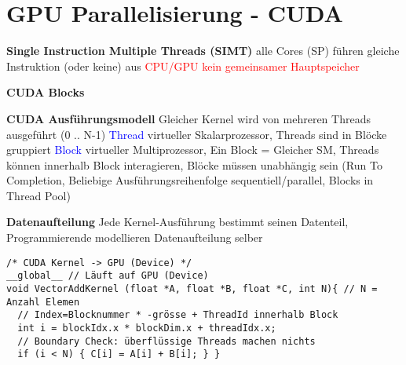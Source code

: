 \section{GPU Parallelisierung - CUDA}

\textbf{Single Instruction Multiple Threads (SIMT)} alle Cores (SP) führen gleiche Instruktion (oder keine) aus \textcolor{red}{CPU/GPU kein gemeinsamer Hauptspeicher}

\textbf{CUDA Blocks}

\textbf{CUDA Ausführungsmodell} Gleicher Kernel wird von mehreren Threads ausgeführt (0 .. N-1) \textcolor{blue}{Thread} virtueller Skalarprozessor, Threads sind in Blöcke gruppiert \textcolor{blue}{Block} virtueller Multiprozessor, Ein Block = Gleicher SM, Threads können innerhalb Block interagieren, Blöcke müssen unabhängig sein (Run To Completion, Beliebige Ausführungsreihenfolge sequentiell/parallel, Blocks in Thread Pool)

\textbf{Datenaufteilung} Jede Kernel-Ausführung bestimmt seinen Datenteil, Programmierende modellieren Datenaufteilung selber

\begin{lstlisting}
/* CUDA Kernel -> GPU (Device) */
__global__ // Läuft auf GPU (Device)
void VectorAddKernel (float *A, float *B, float *C, int N){ // N = Anzahl Elemen
  // Index=Blocknummer * -grösse + ThreadId innerhalb Block
  int i = blockIdx.x * blockDim.x + threadIdx.x;
  // Boundary Check: überflüssige Threads machen nichts
  if (i < N) { C[i] = A[i] + B[i]; } }
\end{lstlisting}

